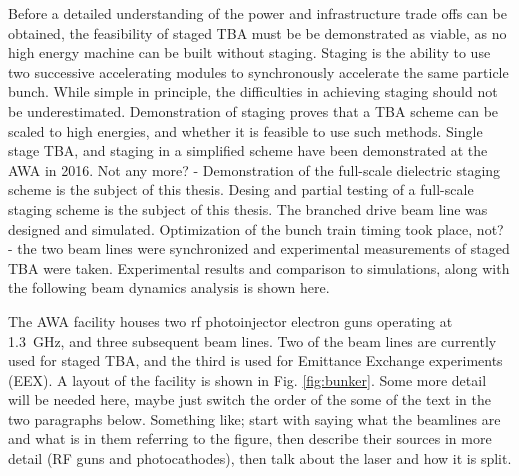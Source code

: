 \documentclass{iitthesis}
\newcommand{\lsnote}[1]{\textsf{{\color{violet}{ LS note:}   #1 }}}
\newcommand{\nrnote}[1]{\textsf{{\color{blue}{ NN note:}   #1 }}}
\begin{document}
Before a detailed understanding of the power and infrastructure trade offs 
can be obtained, the feasibility of staged TBA must be be demonstrated as viable, 
as no high energy machine can be built without staging.
Staging is the ability to use two successive accelerating modules to synchronously accelerate 
the same particle bunch. While simple in principle, the difficulties 
in achieving staging should not be underestimated. 
Demonstration of staging proves that a TBA scheme can be scaled to high energies, and whether it is 
feasible to use such methods. Single stage TBA, and staging 
in a simplified scheme have been demonstrated at the AWA in 2016.
\nrnote{Not any more? - Demonstration of the full-scale dielectric staging scheme is the 
	subject of this thesis.} 
Desing and partial testing of a full-scale staging scheme is the 
subject of this thesis. The branched drive beam line was designed and 
simulated. 
Optimization of the bunch train timing took place, \nrnote{not? - the two 
	beam lines were synchronized and experimental measurements 
	of staged TBA were taken. }
Experimental results and comparison to simulations, along 
with the following beam dynamics analysis is shown here.

 \label{sec:facility}

The AWA facility houses two rf photoinjector electron guns operating
at \SI{1.3}{GHz}, and three subsequent beam lines. 
Two of the beam lines are currently used for staged TBA, and the
third is used for Emittance Exchange experiments (EEX). A layout of
the facility is shown in Fig. \ref{fig:bunker}. 
\lsnote{Some more detail will be needed here, maybe just switch the order of the some of the text in the two paragraphs below.  Something like; start with saying what the beamlines are and what is in them referring to the figure, then describe their sources in more detail (RF guns and photocathodes), then talk about the laser and how it is split.}
\end{document}
